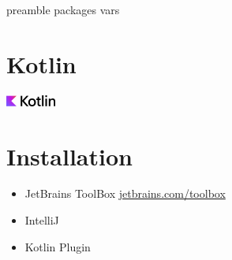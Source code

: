 \RequirePackage{import}
{preamble}
{packages}
{vars}


    \section{Kotlin}\label{sec:kotlin}
    \begin{frame}[c]
        \centering
        \Large
        \includegraphics[scale=3]{../pictures/Kotlin-logo-2021_svg-tex.pdf}
        \linebreak
    \end{frame}

    \section{Installation}\label{sec:installation}
    \begin{frame}
        \slidehead
        \begin{itemize}[<+->]
            \item JetBrains ToolBox \url{jetbrains.com/toolbox}
            \item IntelliJ
            \item Kotlin Plugin
        \end{itemize}
    \end{frame}

